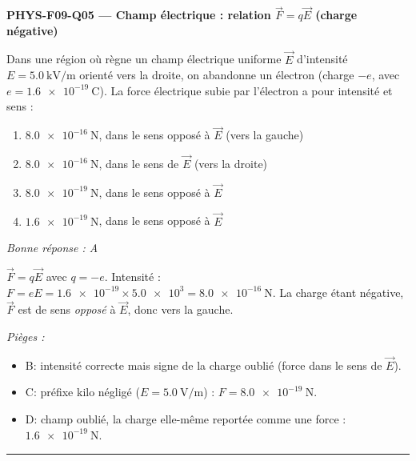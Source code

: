 \documentclass[11pt,a4paper]{article}
\newcommand{\vv}[1]{\vec{#1}}\newcommand{\ds}{\displaystyle}
\begin{document}
\noindent\textbf{PHYS-F09-Q05 --- Champ électrique : relation $\vv F=q\vv E$ (charge négative)}\par
Dans une région où règne un champ électrique uniforme $\vv E$ d'intensité $E=\qty{5.0}{\kilo\volt\per\metre}$ orienté vers la droite, on abandonne un électron (charge $-e$, avec $e=\qty{1.6e-19}{\coulomb}$). La force électrique subie par l'électron a pour intensité et sens :
\begin{enumerate}[label=\Alph*)]
\item $\qty{8.0e-16}{\newton}$, dans le sens opposé à $\vv E$ (vers la gauche)
\item $\qty{8.0e-16}{\newton}$, dans le sens de $\vv E$ (vers la droite)
\item $\qty{8.0e-19}{\newton}$, dans le sens opposé à $\vv E$
\item $\qty{1.6e-19}{\newton}$, dans le sens opposé à $\vv E$
\end{enumerate}
\textit{Bonne réponse : A}\par
$\vv F=q\vv E$ avec $q=-e$. Intensité : $F=eE=\num{1.6e-19}\times\num{5.0e3}=\qty{8.0e-16}{\newton}$. La charge étant négative, $\vv F$ est de sens \emph{opposé} à $\vv E$, donc vers la gauche.\par
\textit{Pièges :}
\begin{itemize}
\item B: intensité correcte mais signe de la charge oublié (force dans le sens de $\vv E$).
\item C: préfixe kilo négligé ($E=\qty{5.0}{\volt\per\metre}$) : $F=\qty{8.0e-19}{\newton}$.
\item D: champ oublié, la charge elle-même reportée comme une force : $\qty{1.6e-19}{\newton}$.
\end{itemize}
\vspace{8pt}\hrule\vspace{8pt}
\end{document}
